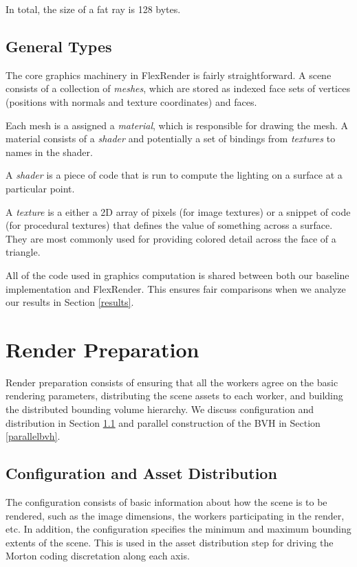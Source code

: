 \documentclass[12pt]{ucthesis}
\begin{document}
In total, the size of a fat ray is 128 bytes.

\subsection{General Types}
\label{types}

The core graphics machinery in FlexRender is fairly straightforward. A scene consists
of a collection of \emph{meshes}, which are stored as indexed face sets of vertices
(positions with normals and texture coordinates) and faces.

Each mesh is a assigned a \emph{material}, which is responsible for drawing the
mesh. A material consists of a \emph{shader} and potentially a set of bindings
from \emph{textures} to names in the shader.

A \emph{shader} is a piece of code that is run to compute the lighting on a
surface at a particular point.

A \emph{texture} is a either a 2D array of pixels (for image textures) or
a snippet of code (for procedural textures) that defines the value of
something across a surface. They are most commonly used for providing colored
detail across the face of a triangle.

All of the code used in graphics computation is shared between both our baseline
implementation and FlexRender. This ensures fair comparisons when we analyze our
results in Section \ref{results}.

\section{Render Preparation}
\label{prep}

Render preparation consists of ensuring that all the workers agree on the
basic rendering parameters, distributing the scene assets to each worker, and
building the distributed bounding volume hierarchy. We discuss configuration
and distribution in Section \ref{sync} and parallel construction of the BVH in
Section \ref{parallelbvh}.

\subsection{Configuration and Asset Distribution}
\label{sync}

The configuration consists of basic information about how the scene is to be
rendered, such as the image dimensions, the workers participating in the render,
etc. In addition, the configuration specifies the minimum and maximum bounding
extents of the scene. This is used in the asset distribution step for driving
the Morton coding discretation along each axis.
\end{document}
